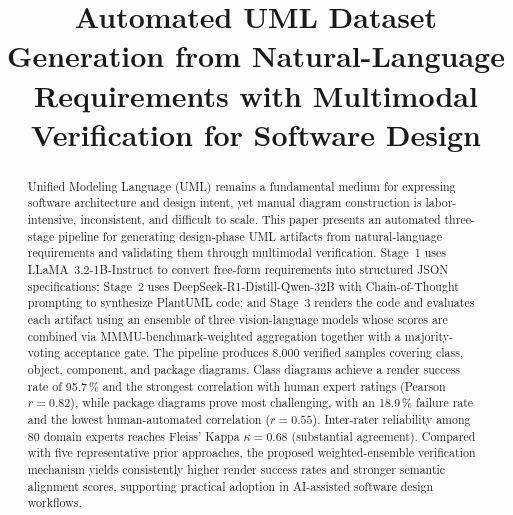 \documentclass[conference]{IEEEtran}
\begin{document}
\title{Automated UML Dataset Generation from Natural-Language
Requirements with Multimodal Verification for Software Design}

\author{
  \and
  }

\maketitle

\begin{abstract}
Unified Modeling Language (UML) remains a fundamental medium for
expressing software architecture and design intent, yet manual diagram
construction is labor-intensive, inconsistent, and difficult to scale.
This paper presents an automated three-stage pipeline for generating
design-phase UML artifacts from natural-language requirements and
validating them through multimodal verification. Stage~1 uses
LLaMA~3.2-1B-Instruct to convert free-form requirements into structured
JSON specifications; Stage~2 uses DeepSeek-R1-Distill-Qwen-32B with
Chain-of-Thought prompting to synthesize PlantUML code; and Stage~3
renders the code and evaluates each artifact using an ensemble of three
vision-language models whose scores are combined via
MMMU-benchmark-weighted aggregation together with a majority-voting
acceptance gate. The pipeline produces 8,000 verified samples covering
class, object, component, and package diagrams. Class diagrams achieve
a render success rate of 95.7\,\% and the strongest correlation with
human expert ratings (Pearson $r = 0.82$), while package diagrams prove
most challenging, with an 18.9\,\% failure rate and the lowest
human-automated correlation ($r = 0.55$). Inter-rater reliability among
80 domain experts reaches Fleiss' Kappa $\kappa = 0.68$ (substantial
agreement). Compared with five representative prior approaches, the
proposed weighted-ensemble verification mechanism yields consistently
higher render success rates and stronger semantic alignment scores,
supporting practical adoption in AI-assisted software design workflows.
\end{abstract}
\end{document}
